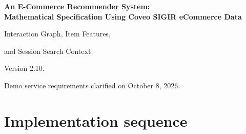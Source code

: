 \documentclass[12pt,a4paper]{article}
\theoremstyle{plainru}
\begin{document}
\begin{center}
{\Large\bfseries An E-Commerce Recommender System:\\[0.3em]
Mathematical Specification Using Coveo SIGIR eCommerce Data\par}
\vspace{0.7em}
{\large Interaction Graph, Item Features,\par
and Session Search Context\par}
\vspace{0.7em}
{Version 2.10.\par}
{Demo service requirements clarified on October 8, 2026.\par}
\end{center}
\begin{abstract}
The initial version uses a transition graph, provided description
and image vectors, search, and LambdaMART ranking. A neural extension
learns item representations and session intents.
Each stage specifies its inputs, training procedure, validation,
and conditions for proceeding to the next stage.
The business objective is to increase the number of sessions with a purchase per 1000 eligible sessions.
The first Coveo evaluation measures whether the first recommendation list includes a recorded future purchase
among sessions with at least one such purchase. Telemetry completeness
remains unknown; evaluation over all sessions requires it to be confirmed.
The data support measuring agreement with historical purchases;
causal effects require a randomized experiment with recommendation impressions.
This specification contains no training results or load measurements.
\end{abstract}

\section*{Implementation sequence}
\label{sec:reading-route}
\label{sec:first-run}\label{sec:stage-acceptance}
\end{document}
